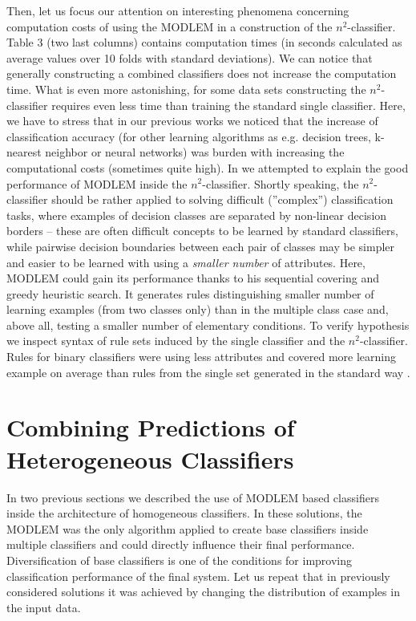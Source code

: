 \documentclass{llncs}
\begin{document}
Then, let us focus our attention on interesting phenomena concerning
computation costs of using the MODLEM in a construction of the
$n^2$-classifier. Table 3 (two last columns) contains computation times (in
seconds calculated as average values over 10 folds with standard
deviations). We can notice that generally constructing a combined
classifiers does not increase the computation time. What is even more
astonishing, for some data sets constructing the $n^2$-classifier requires
even less time than training the standard single classifier. Here, we have
to stress that in our previous works \cite{JelStef98,habcia} we noticed that
the increase of classification accuracy (for other learning algorithms as
e.g. decision trees, k-nearest neighbor or neural networks) was burden with
increasing the computational costs (sometimes quite high). In \cite{Uppsala}
we attempted to explain the good performance of MODLEM inside the
$n^2$-classifier. Shortly speaking, the $n^2$-classifier should be rather
applied to solving difficult (''complex'') classification tasks, where
examples of decision classes are separated by non-linear decision borders --
these are often difficult concepts to be learned by standard classifiers,
while pairwise decision boundaries between each pair of classes may be
simpler and easier to be learned with using a {\em smaller number} of
attributes. Here, MODLEM could gain its performance thanks to his sequential
covering and greedy heuristic search. It generates rules distinguishing
smaller number of learning examples (from two classes only) than in the
multiple class case and, above all, testing a smaller number of elementary
conditions. To verify hypothesis we inspect syntax of rule sets induced by
the single classifier and the $n^2$-classifier. Rules for binary classifiers
were using less attributes and covered more learning example on average than
rules from the single set generated in the standard way \cite{Uppsala}.





\section{Combining Predictions of Heterogeneous Classifiers}

In two previous sections we described the use of MODLEM based classifiers
inside the architecture of homogeneous classifiers. In these solutions, the
MODLEM was the only algorithm applied to create base classifiers inside
multiple classifiers and could directly influence their final performance.
Diversification of base classifiers is one of the conditions for improving
classification performance of the final system.  Let us repeat that in
previously considered solutions it was achieved by changing the distribution
of examples in the input data.
\end{document}
